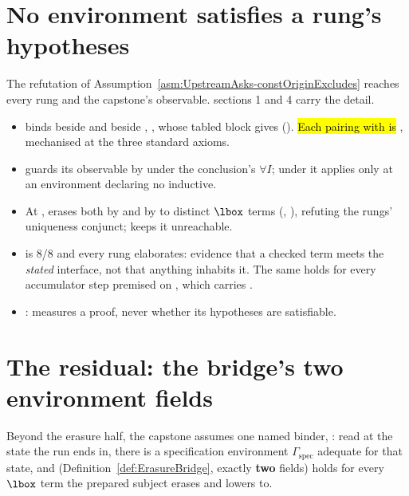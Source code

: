 \section{No environment satisfies a rung's hypotheses}
\label{sec:trust:vacuity}

The refutation of Assumption~\ref{asm:UpstreamAsks-constOriginExcludes} reaches every rung and
the capstone's observable.  sections 1 and 4 carry the detail.

\begin{itemize}
\item {} binds  beside  and beside , , whose tabled  block gives 
(). \hl{Each pairing with  is }, mechanised at the
three standard axioms.
\item {} guards its observable by  under the
conclusion's $\forall I$; under  it applies only at an environment declaring no inductive.
\item {} At ,  erases both by
 and by  to distinct $\lbox$ terms
(, ), refuting the rungs' uniqueness conjunct;
 keeps it unreachable.
\item {}  is 8/8 and every rung elaborates:
evidence that a checked term meets the \emph{stated} interface, not that anything inhabits it.
The same holds for every accumulator step premised on , which carries .
\item {}:  measures a proof, never whether its
hypotheses are satisfiable.
\end{itemize}

\section{The residual: the bridge's two environment fields}
\label{sec:trust:bridge}

Beyond the erasure half, the capstone assumes one named binder, : read at the state
the  run ends in, there is a specification environment $\Gamma_{\mathrm{spec}}$
adequate for that state, and  (Definition~\ref{def:ErasureBridge}, exactly
\textbf{two} fields) holds for every $\lbox$ term the prepared subject erases and lowers to.

